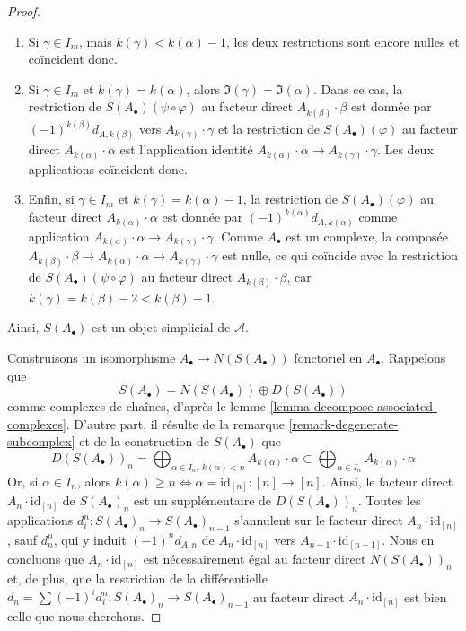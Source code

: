 \begin{proof}
\begin{enumerate}
\begin{enumerate}
$S(A_\bullet)(\psi \circ \varphi)$ au facteur direct $A_{k(\beta)} \cdot \beta$
et celle de $S(A_\bullet)(\varphi)$ au facteur direct
$A_{k(\alpha)} \cdot \alpha$ sont toutes deux nulles ; elles coïncident donc.
\item Si $\gamma \in I_m$, mais $k(\gamma) < k(\alpha) - 1$,
les deux restrictions sont encore nulles et coïncident donc.
\item Si $\gamma \in I_m$ et $k(\gamma) = k(\alpha)$, alors
$\Im(\gamma) = \Im(\alpha)$. Dans ce cas, la restriction de
$S(A_\bullet)(\psi \circ \varphi)$
au facteur direct $A_{k(\beta)} \cdot \beta$ est donnée par
$(-1)^{k(\beta)}d_{A, k(\beta)}$ vers $A_{k(\gamma)} \cdot \gamma$
et la restriction de $S(A_\bullet)(\varphi)$ au facteur direct
$A_{k(\alpha)} \cdot \alpha$ est l'application identité
$A_{k(\alpha)} \cdot \alpha \to A_{k(\gamma)} \cdot \gamma$.
Les deux applications coïncident donc.
\item Enfin, si $\gamma \in I_m$ et $k(\gamma) = k(\alpha) - 1$, la restriction de
$S(A_\bullet)(\varphi)$ au facteur direct
$A_{k(\alpha)} \cdot \alpha$ est donnée par $(-1)^{k(\alpha)} d_{A, k(\alpha)}$
comme application
$A_{k(\alpha)} \cdot \alpha \to A_{k(\gamma)} \cdot \gamma$.
Comme $A_\bullet$ est un complexe, la composée
$A_{k(\beta)} \cdot \beta \to
A_{k(\alpha)} \cdot \alpha \to A_{k(\gamma)} \cdot \gamma$
est nulle, ce qui coïncide avec la restriction de
$S(A_\bullet)(\psi \circ \varphi)$
au facteur direct $A_{k(\beta)} \cdot \beta$,
car $k(\gamma) = k(\beta) - 2 < k(\beta) - 1$.
\end{enumerate}
\end{enumerate}
Ainsi, $S(A_\bullet)$ est un objet simplicial de $\mathcal{A}$.

\medskip\noindent
Construisons un isomorphisme $A_\bullet \to N(S(A_\bullet))$
fonctoriel en $A_\bullet$. Rappelons que
$$
S(A_\bullet) =  N(S(A_\bullet)) \oplus D(S(A_\bullet))
$$
comme complexes de chaînes, d'après le lemme
\ref{lemma-decompose-associated-complexes}.
D'autre part, il résulte de la remarque \ref{remark-degenerate-subcomplex}
et de la construction de $S(A_\bullet)$ que
$$
D(S(A_\bullet))_n =
\bigoplus\nolimits_{\alpha \in I_n,\ k(\alpha) < n} A_{k(\alpha)} \cdot \alpha
\subset
\bigoplus\nolimits_{\alpha \in I_n} A_{k(\alpha)} \cdot \alpha
$$
Or, si $\alpha \in I_n$, alors
$k(\alpha) \geq n \Leftrightarrow \alpha = \text{id}_{[n]} : [n] \to [n]$.
Ainsi, le facteur direct $A_n \cdot \text{id}_{[n]}$ de $S(A_\bullet)_n$
est un supplémentaire de $D(S(A_\bullet))_n$.
Toutes les applications $d^n_i : S(A_\bullet)_n \to S(A_\bullet)_{n - 1}$
s'annulent sur le facteur direct $A_n \cdot \text{id}_{[n]}$,
sauf $d^n_n$, qui y induit $(-1)^n d_{A, n}$ de
$A_n \cdot \text{id}_{[n]}$ vers $A_{n - 1} \cdot \text{id}_{[n - 1]}$.
Nous en concluons que $A_n \cdot \text{id}_{[n]}$ est nécessairement
égal au facteur direct $N(S(A_\bullet))_n$ et, de plus, que
la restriction de la différentielle
$d_n = \sum (-1)^id^n_i : S(A_\bullet)_n \to S(A_\bullet)_{n - 1}$
au facteur direct $A_n \cdot \text{id}_{[n]}$ est bien celle que nous cherchons.


\end{proof}
